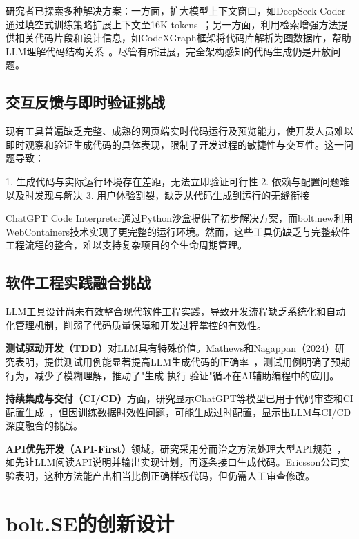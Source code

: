 研究者已探索多种解决方案：一方面，扩大模型上下文窗口，如DeepSeek-Coder通过填空式训练策略扩展上下文至16K tokens~\cite{arxiv2401,Guo2024}；另一方面，利用检索增强方法提供相关代码片段和设计信息，如CodeXGraph框架将代码库解析为图数据库，帮助LLM理解代码结构关系~\cite{LLMCodeGraph2024}。尽管有所进展，完全架构感知的代码生成仍是开放问题。

\subsection{交互反馈与即时验证挑战}

现有工具普遍缺乏完整、成熟的网页端实时代码运行及预览能力，使开发人员难以即时观察和验证生成代码的具体表现，限制了开发过程的敏捷性与交互性。这一问题导致：

1. 生成代码与实际运行环境存在差距，无法立即验证可行性
2. 依赖与配置问题难以及时发现与解决
3. 用户体验割裂，缺乏从代码生成到运行的无缝衔接

ChatGPT Code Interpreter通过Python沙盒提供了初步解决方案，而bolt.new利用WebContainers技术实现了更完整的运行环境。然而，这些工具仍缺乏与完整软件工程流程的整合，难以支持复杂项目的全生命周期管理。

\subsection{软件工程实践融合挑战}

LLM工具设计尚未有效整合现代软件工程实践，导致开发流程缺乏系统化和自动化管理机制，削弱了代码质量保障和开发过程掌控的有效性。

\textbf{测试驱动开发（TDD）}对LLM具有特殊价值。Mathews和Nagappan（2024）研究表明，提供测试用例能显著提高LLM生成代码的正确率~\cite{Mathews2024TDD}，测试用例明确了预期行为，减少了模糊理解，推动了"生成-执行-验证"循环在AI辅助编程中的应用。

\textbf{持续集成与交付（CI/CD）}方面，研究显示ChatGPT等模型已用于代码审查和CI配置生成~\cite{ChatGPTUsage2023}，但因训练数据时效性问题，可能生成过时配置，显示出LLM与CI/CD深度融合的挑战。

\textbf{API优先开发（API-First）}领域，研究采用分而治之方法处理大型API规范~\cite{DivaCopilot}，如先让LLM阅读API说明并输出实现计划，再逐条接口生成代码。Ericsson公司实验表明，这种方法能产出相当比例正确样板代码，但仍需人工审查修改。

\section{bolt.SE的创新设计}

